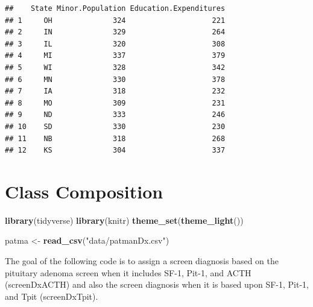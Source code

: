 \documentclass[]{book}
\newenvironment{Shaded}{\begin{snugshade}}{\end{snugshade}}
\newcommand{\KeywordTok}[1]{\textcolor[rgb]{0.13,0.29,0.53}{\textbf{#1}}}
\newcommand{\NormalTok}[1]{#1}
\newcommand{\StringTok}[1]{\textcolor[rgb]{0.31,0.60,0.02}{#1}}
\begin{document}
\begin{verbatim}
##    State Minor.Population Education.Expenditures
## 1     OH              324                    221
## 2     IN              329                    264
## 3     IL              320                    308
## 4     MI              337                    379
## 5     WI              328                    342
## 6     MN              330                    378
## 7     IA              318                    232
## 8     MO              309                    231
## 9     ND              333                    246
## 10    SD              330                    230
## 11    NB              318                    268
## 12    KS              304                    337
\end{verbatim}

\hypertarget{class-composition}{%
\chapter{Class Composition}\label{class-composition}}

\begin{Shaded}
\begin{Highlighting}[]
\KeywordTok{library}\NormalTok{(tidyverse)}
\KeywordTok{library}\NormalTok{(knitr)}
\KeywordTok{theme_set}\NormalTok{(}\KeywordTok{theme_light}\NormalTok{())}

\NormalTok{patma <-}\StringTok{ }\KeywordTok{read_csv}\NormalTok{(}\StringTok{"data/patmanDx.csv"}\NormalTok{)}
\end{Highlighting}
\end{Shaded}

The goal of the following code is to assign a screen diagnosis based on the pituitary adenoma screen when it includes SF-1, Pit-1, and ACTH (screenDxACTH) and also the screen diagnosis when it is based upon SF-1, Pit-1, and Tpit (screenDxTpit).
\end{document}
